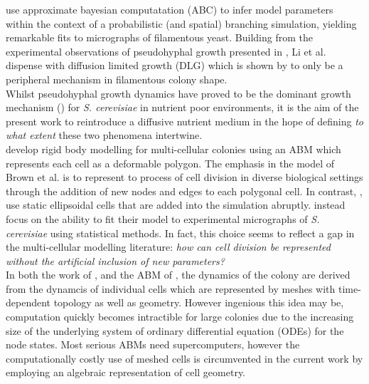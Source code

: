  \cite{li2024off} use approximate bayesian computatation (ABC)
 to infer model parameters within the context of a probabilistic (and spatial) branching simulation, 
 yielding remarkable fits to micrographs of filamentous yeast. Building 
 from the experimental observations of pseudohyphal growth presented in 
 \cite{gimeno1992unipolar}, Li et al. dispense with diffusion limited growth (DLG) which is
shown by \cite{tronnolone2018diffusion} to only be a peripheral mechanism in filamentous 
colony shape.
\\

Whilst pseudohyphal growth dynamics
have proved to be the dominant growth mechanism (\cite{tronnolone2018diffusion}) for 
\textit{S. cerevisiae} in nutrient poor environments, it is the aim of the present 
work to reintroduce a diffusive nutrient medium in the hope of defining 
\textit{to what extent} these two phenomena intertwine.
\\

\cite{brown2021rigid} develop rigid body modelling for multi-cellular colonies using 
an ABM which represents each cell as a deformable polygon. The emphasis in the model 
of Brown et al. is to represent to process of cell division in diverse biological 
settings through the addition of new nodes and edges to each polygonal cell. 
In contrast, \cite{li2024off}, use static ellipsoidal cells that are added into the simulation
abruptly. \cite{li2024off} instead focus on the ability to fit their model 
to experimental micrographs of \textit{S. cerevisiae} using statistical methods.
In fact, this choice seems to reflect a gap in the multi-cellular modelling literature:
\textit{how can cell division be represented without the artificial inclusion of new parameters?}
\\

In both the work of \cite{van2020quantitative}, and the ABM of 
\cite{brown2021rigid}, the dynamics of the colony 
are derived from the dynamcis of individual cells which are represented
by meshes with time-dependent topology as well as geometry. However ingenious this idea may be, 
computation quickly becomes intractible for large colonies
due to the increasing size of the underlying system of ordinary differential equation (ODEs)
for the node states. Most serious ABMs need supercomputers, however
the computationally costly use of meshed cells is circumvented in the current work by employing 
an algebraic representation of cell geometry.
\\





